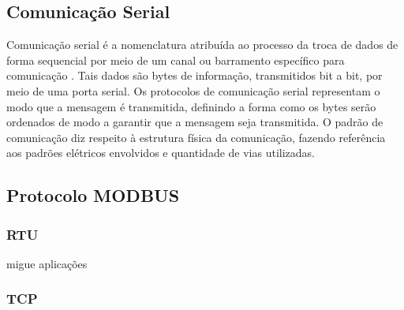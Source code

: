 \subsection{Comunicação Serial}
Comunicação serial é a nomenclatura atribuída ao processo da troca de dados de forma sequencial por meio de um canal ou barramento específico para comunicação . Tais dados são bytes de informação, transmitidos bit a bit, por meio de uma porta serial.	
Os protocolos de comunicação serial representam o modo que a mensagem é transmitida, definindo a forma como os bytes serão ordenados de modo a garantir que a mensagem seja transmitida.
O padrão de comunicação diz respeito à estrutura física da comunicação, fazendo referência aos padrões elétricos envolvidos e quantidade de vias utilizadas.
\subsection{Protocolo MODBUS}
\subsubsection{RTU}
migue aplicações
\subsubsection{TCP}
